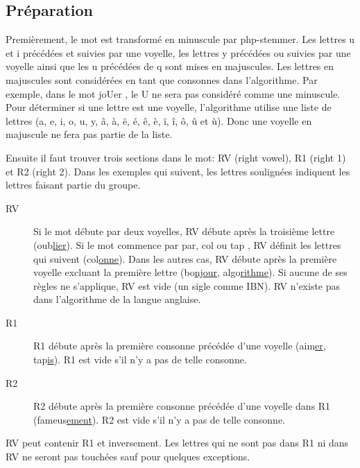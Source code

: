 \subsection*{Préparation}

Premièrement, le mot est transformé en minuscule par php-stemmer.
Les lettres u et i précédées et suivies par une voyelle, les lettres y précédées ou suivies par une voyelle ainsi que les u précédées de q sont mises en majuscules.
Les lettres en majuscules sont considérées en tant que consonnes dans l'algorithme.
Par exemple, dans le mot \og joUer \fg{}, le U ne sera pas considéré comme une minuscule.
Pour déterminer si une lettre est une voyelle, l'algorithme utilise une liste de lettres (a, e, i, o, u, y, â, à, ë, é, ê, è, ï, î, ô, û et ù).
Donc une voyelle en majuscule ne fera pas partie de la liste.

Ensuite il faut trouver trois sections dans le mot: RV (right vowel), R1 (right 1) et R2 (right 2).
Dans les exemples qui suivent, les lettres soulignées indiquent les lettres faisant partie du groupe.

\begin{description}
  \item[RV]
  
  Si le mot débute par deux voyelles, RV débute après la troisième lettre (oub\underline{lier}).
  Si le mot commence par \og par, col ou tap \fg{}, RV définit les lettres qui suivent (col\underline{onne}).
  Dans les autres cas, RV débute après la première voyelle excluant la première lettre (bo\underline{njour}, algo\underline{rithme}).
  Si aucune de ses règles ne s'applique, RV est vide (un sigle comme IBN).
  RV n'existe pas dans l'algorithme de la langue anglaise.
  
  \item[R1]
  
  R1 débute après la première consonne précédée d'une voyelle (aim\underline{er}, tap\underline{is}).
  R1 est vide s'il n'y a pas de telle consonne.
  
  \item[R2]
  
  R2 débute après la première consonne précédée d'une voyelle dans R1 (fameus\underline{ement}).
  R2 est vide s'il n'y a pas de telle consonne.
\end{description}

RV peut contenir R1 et inversement.
Les lettres qui ne sont pas dans R1 ni dans RV ne seront pas touchées sauf pour quelques exceptions.

